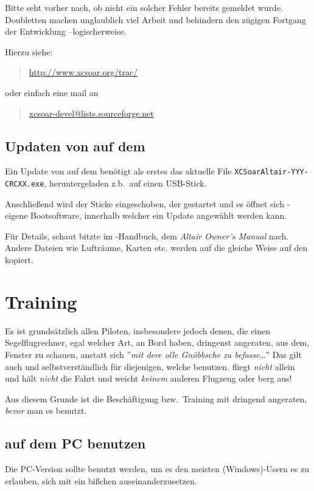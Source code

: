 Bitte seht vorher nach, ob nicht ein solcher Fehler bereits gemeldet wurde. 
Doubletten machen unglaublich viel Arbeit und behindern den zügigen Fortgang der Entwicklung --logischerweise.  


Hierzu siehe:  
\begin{quote}
\url{http://www.xcsoar.org/trac/}
\end{quote}
oder einfach eine mail an 
\begin{quote}
\url{xcsoar-devel@lists.sourceforge.net}
\end{quote} 

\subsection*{Updaten von \xc auf dem \al}

Ein Update von \xc auf dem \al  benötigt als erstes das aktuelle  File {\tt XCSoarAltair-YYY-CRCXX.exe}, 
heruntergeladen z.b.\ auf einen USB-Stick. 

Anschließend wird der Sticke eingeschoben, der \al gestartet und es öffnet sich \al-eigene Bootsoftware, 
innerhalb welcher ein Update angewählt werden kann.

Für Details, schaut bitzte im \al-Handbuch, dem {\em Altair Owner's Manual} nach.
Andere Dateien wie Lufträume, Karten etc. werden auf die gleiche Weise auf den \al kopiert. 

\section{Training}
Es ist grundsätzlich allen Piloten,  insbesondere jedoch denen, die einen Segelflugrechner,  egal welcher Art, an Bord haben, 
dringenst angeraten, aus dem, Fenster zu schauen, anstatt sich ''{\it mit dere olle Gnöbbsche zu befasse\dots}''
\achtung 
Das gilt auch und selbstverständlich für diejenigen, welche \xc benutzen. \xc fliegt {\sl nicht} allein und hält {\sl nicht} 
die Fahrt und weicht {\sl keinem}  anderen Flugzeug oder berg aus! 

Aus diesem Grunde ist die Beschäftigung bzw.\ Training mit \xc dringend angeraten, {\sl bevor} man es benutzt. 


\subsection*{\xc auf dem PC benutzen}
Die PC-Version sollte benutzt werden, um es den meisten (Windows)-Usern es zu erlauben, sich mit \xc ein 
bißchen auseinanderzusetzen. 

